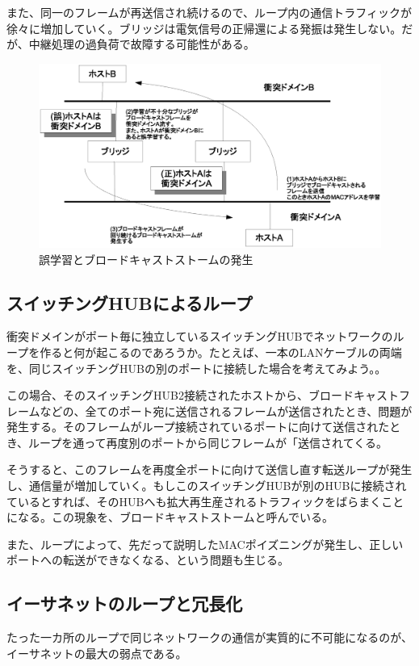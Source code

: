 また、同一のフレームが再送信され続けるので、ループ内の通信トラフィックが徐々に増加していく。ブリッジは電気信号の正帰還による発振は発生しない。だが、中継処理の過負荷で故障する可能性がある。

\begin{figure}[htbp]
	\includegraphics[width=12cm,clip]{draw/bridgeloop.eps}
	\caption{誤学習とブロードキャストストームの発生}
	\label{fig:bridgeloop}
\end{figure}


\subsection{スイッチングHUBによるループ}

衝突ドメインがポート毎に独立しているスイッチングHUBでネットワークのループを作ると何が起こるのであろうか。たとえば、一本のLANケーブルの両端を、同じスイッチングHUBの別のポートに接続した場合を考えてみよう。。

この場合、そのスイッチングHUB2接続されたホストから、ブロードキャストフレームなどの、全てのポート宛に送信されるフレームが送信されたとき、問題が発生する。そのフレームがループ接続されているポートに向けて送信されたとき、ループを通って再度別のポートから同じフレームが「送信されてくる。

そうすると、このフレームを再度全ポートに向けて送信し直す転送ループが発生し、通信量が増加していく。もしこのスイッチングHUBが別のHUBに接続されているとすれば、そのHUBへも拡大再生産されるトラフィックをばらまくことになる。この現象を、ブロードキャストストームと呼んでいる。

また、ループによって、先だって説明したMACポイズニングが発生し、正しいポートへの転送ができなくなる、という問題も生じる。

\subsection{イーサネットのループと冗長化}
たった一カ所のループで同じネットワークの通信が実質的に不可能になるのが、イーサネットの最大の弱点である。

